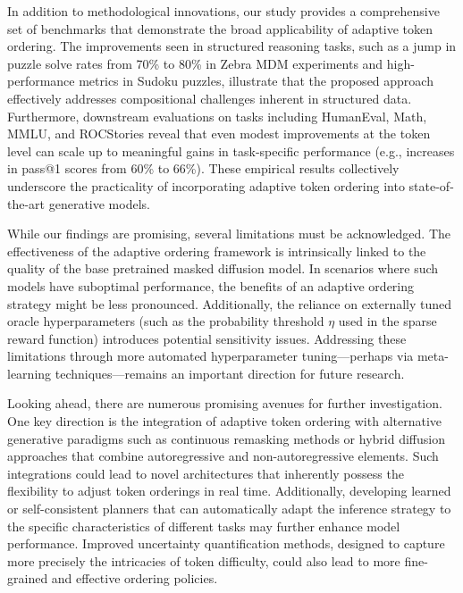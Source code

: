 \documentclass{article} %
\begin{document}
\par In addition to methodological innovations, our study provides a comprehensive set of benchmarks that demonstrate the broad applicability of adaptive token ordering. The improvements seen in structured reasoning tasks, such as a jump in puzzle solve rates from 70\% to 80\% in Zebra MDM experiments and high-performance metrics in Sudoku puzzles, illustrate that the proposed approach effectively addresses compositional challenges inherent in structured data. Furthermore, downstream evaluations on tasks including HumanEval, Math, MMLU, and ROCStories reveal that even modest improvements at the token level can scale up to meaningful gains in task-specific performance (e.g., increases in pass@1 scores from 60\% to 66\%). These empirical results collectively underscore the practicality of incorporating adaptive token ordering into state-of-the-art generative models.

\par While our findings are promising, several limitations must be acknowledged. The effectiveness of the adaptive ordering framework is intrinsically linked to the quality of the base pretrained masked diffusion model. In scenarios where such models have suboptimal performance, the benefits of an adaptive ordering strategy might be less pronounced. Additionally, the reliance on externally tuned oracle hyperparameters (such as the probability threshold \(\eta\) used in the sparse reward function) introduces potential sensitivity issues. Addressing these limitations through more automated hyperparameter tuning—perhaps via meta-learning techniques—remains an important direction for future research.

\par Looking ahead, there are numerous promising avenues for further investigation. One key direction is the integration of adaptive token ordering with alternative generative paradigms such as continuous remasking methods or hybrid diffusion approaches that combine autoregressive and non-autoregressive elements. Such integrations could lead to novel architectures that inherently possess the flexibility to adjust token orderings in real time. Additionally, developing learned or self-consistent planners that can automatically adapt the inference strategy to the specific characteristics of different tasks may further enhance model performance. Improved uncertainty quantification methods, designed to capture more precisely the intricacies of token difficulty, could also lead to more fine-grained and effective ordering policies.
\end{document}
